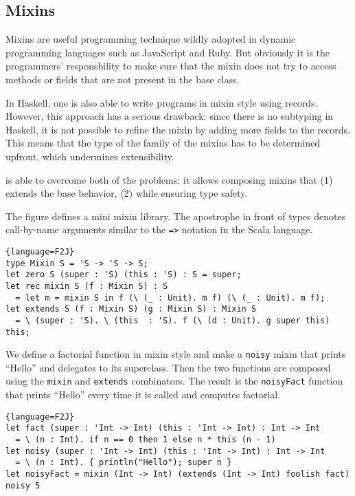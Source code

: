 
\subsection{Mixins}

Mixins are useful programming technique wildly adopted in dynamic programming
languages such as JavaScript and Ruby. But obviously it is the programmers'
responsbility to make sure that the mixin does not try to access methods or
fields that are not present in the base class.

In Haskell, one is also able to write programs in mixin style using records.
However, this approach has a serious drawback: since there is no subtyping in
Haskell, it is not possible to refine the mixin by adding more fields to the
records. This means that the type of the family of the mixins has to be
determined upfront, which undermines extensibility.

\name is able to overcome both of the problems: it allows composing mixins
that (1) extends the base behavior, (2) while ensuring type safety.

The figure defines a mini mixin library. The apostrophe in front of types
denotes call-by-name arguments similar to the \lstinline{=>} notation in the
Scala language.

\begin{lstlisting}{language=F2J}
type Mixin S = 'S -> 'S -> S;
let zero S (super : 'S) (this : 'S) : S = super;
let rec mixin S (f : Mixin S) : S
  = let m = mixin S in f (\ (_ : Unit). m f) (\ (_ : Unit). m f);
let extends S (f : Mixin S) (g : Mixin S) : Mixin S
  = \ (super : 'S). \ (this  : 'S). f (\ (d : Unit). g super this) this;
\end{lstlisting}

We define a factorial function in mixin style and make a \lstinline{noisy} mixin
that prints ``Hello'' and delegates to its superclass. Then the two functions
are composed using the \lstinline{mixin} and \lstinline{extends} combinators.
The result is the \lstinline{noisyFact} function that prints ``Hello'' every
time it is called and computes factorial.
\begin{lstlisting}{language=F2J}
let fact (super : 'Int -> Int) (this : 'Int -> Int) : Int -> Int
  = \ (n : Int). if n == 0 then 1 else n * this (n - 1)
let noisy (super : 'Int -> Int) (this : 'Int -> Int) : Int -> Int
  = \ (n : Int). { println("Hello"); super n }
let noisyFact = mixin (Int -> Int) (extends (Int -> Int) foolish fact)
noisy 5
\end{lstlisting}

